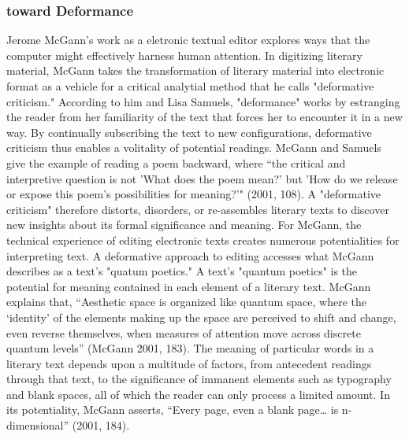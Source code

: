 \documentclass[11pt]{article}
\begin{document}
\subsubsection{toward Deformance}
\label{sec:org109f427}

Jerome McGann's work as a eletronic textual editor explores ways that
the computer might effectively harness human attention. In digitizing
literary material, McGann takes the transformation of literary
material into electronic format as a vehicle for a critical analytial
method that he calls "deformative criticism." According to him and
Lisa Samuels, "deformance" works by estranging the reader from her
familiarity of the text that forces her to encounter it in a new
way. By continually subscribing the text to new configurations,
deformative criticism thus enables a volitality of potential readings.
McGann and Samuels give the example of reading a poem backward, where
“the critical and interpretive question is not 'What does the poem
mean?'  but 'How do we release or expose this poem’s possibilities for
meaning?'" (2001, 108). A "deformative criticism" therefore distorts,
disorders, or re-assembles literary texts to discover new insights
about its formal significance and meaning. For McGann, the technical
experience of editing electronic texts creates numerous potentialities
for interpreting text. A deformative approach to editing accesses what
McGann describes as a text's "quatum poetics." A text's "quantum
poetics" is the potential for meaning contained in each element of a
literary text. McGann explains that, “Aesthetic space is organized
like quantum space, where the ‘identity’ of the elements making up the
space are perceived to shift and change, even reverse themselves, when
measures of attention move across discrete quantum levels” (McGann
2001, 183). The meaning of particular words in a literary text depends
upon a multitude of factors, from antecedent readings through that
text, to the significance of immanent elements such as typography and
blank spaces, all of which the reader can only process a limited
amount. In its potentiality, McGann asserts, “Every page, even a blank
page\ldots{} is n-dimensional” (2001, 184).
\end{document}
